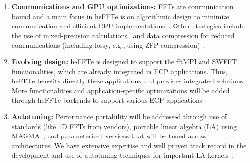 \begin{enumerate}
\item
\textbf{Communications and GPU optimizations:}
FFTs are communication bound and a main focus in heFFTe is on algorithmic
design to minimize communication and efficient GPU 
implementations~\cite{sc19,eurompi19,heffte-pact21,hpec21}.
Other strategies include the use of mixed-precision calculations~\cite{Haidar2018,tcfft18}
and data compression for reduced communications (including lossy, e.g., using ZFP 
compression)~\cite{Anztetal2020}.
\item
\textbf{Evolving design:}
heFFTe is designed to support the fftMPI and SWFFT functionalities,
which are already integrated in ECP applications. Thus, heFFTe benefits
directly these applications and provides integrated solutions. 
More functionalities and application-specific optimizations will be added 
through heFFTe backends to support various ECP applications. 
\item
\textbf{Autotuning:}
Performance portability will be addressed through use of standards (like 1D FFTs 
from vendors), portable linear algebra (LA) using MAGMA~\cite{Tomov_2010_pcsa}, 
and parameterized versions that will be tuned across architectures. We have extensive 
expertise and well proven track record in the development and use of autotuning techniques 
for important LA kernels~\cite{Nath2010,Kurzak2012gemmfermi}. 
\end{enumerate}

